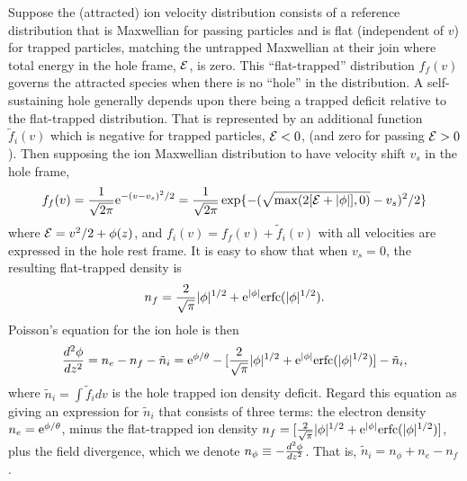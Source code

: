 \documentclass[12pt]{article}  %
\def\energy{{\cal E}}
\def\etothe#1{{\rm e}^{#1}}
\begin{document}
Suppose the (attracted) ion velocity distribution consists of a
reference distribution that is Maxwellian for passing particles and is
flat (independent of $v$) for trapped particles, matching the
untrapped Maxwellian at their join where total energy in the hole
frame, $\energy$, is zero. This ``flat-trapped'' distribution $f_f(v)$
governs the attracted species when there is no ``hole'' in the
distribution. A self-sustaining hole generally depends upon there
being a trapped deficit relative to the flat-trapped
distribution. That is represented by an additional function
$\tilde f_i(v)$ which is negative for trapped particles, $\energy<0$,
(and zero for passing $\energy>0$). Then supposing the ion Maxwellian
distribution to have velocity shift $v_s$ in the hole frame,
\begin{equation}
  \label{eq:flattrap}
  f_f(v)={1\over \sqrt{2\pi}}\etothe{-(v-v_s)^2/2}
  ={1\over \sqrt{2\pi}}\exp\{-(\sqrt{{\rm max}(2[\energy+|\phi|],0)}-v_s)^2/2\}
\end{equation}
where $\energy=v^2/2+\phi(z)$, and $f_i(v)=f_f(v)+\tilde f_i(v)$ with all
velocities are expressed in the hole rest frame. It is easy to show
that when $v_s=0$, the resulting flat-trapped density is
\begin{equation}
  \label{eq:nft}
  n_f=  {2\over \sqrt{\pi}}|\phi|^{1/2}+
  \etothe{|\phi|}{\rm erfc}(|\phi|^{1/2}).
\end{equation}
Poisson's equation for the ion hole is then
\begin{equation}
  \label{eq:Poisson}
  {d^2\phi\over dz^2} = n_e-n_f-\tilde n_i
  = \etothe{\phi/\theta}- [{2\over \sqrt{\pi}}|\phi|^{1/2}+
  \etothe{|\phi|}{\rm erfc}(|\phi|^{1/2})] -\tilde n_i,
\end{equation}
where $\tilde n_i=\int \tilde f_i dv$ is the hole trapped ion density
deficit.  Regard this equation as giving an expression for
$\tilde n_i$ that consists of three terms: the electron density
$n_e=\etothe{\phi/\theta}$, minus the flat-trapped ion density
$n_f= [{2\over \sqrt{\pi}}|\phi|^{1/2}+ \etothe{|\phi|}{\rm
  erfc}(|\phi|^{1/2})]$, plus the field divergence, which we denote
$n_\phi\equiv-{d^2\phi\over dz^2}$. That is, $\tilde n_i=
n_\phi+n_e-n_f$.
\end{document}
